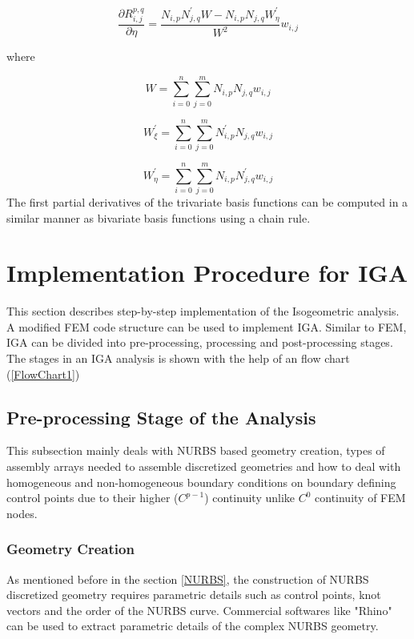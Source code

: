 \documentclass[12pt]{article}
\begin{document}
\begin{equation}
\frac{\partial R_{i,j}^{p,q}}{\partial \eta} = \frac{N_{i,p} N^{'}_{j,q} W - N_{i,p} N_{j,q} W^{'}_{\eta}}{W^2}w_{i,j}
\end{equation}

\noindent
where

\begin{equation}
W = \sum_{i=0}^{n}\sum_{j=0}^{m}N_{i,p} N_{j,q}w_{i,j}
\end{equation}

\begin{equation}
W^{'}_{\xi} = \sum_{i=0}^{n}\sum_{j=0}^{m}N^{'}_{i,p} N_{j,q}w_{i,j}
\end{equation}

\begin{equation}
W^{'}_{\eta} = \sum_{i=0}^{n}\sum_{j=0}^{m}N_{i,p} N^{'}_{j,q}w_{i,j}
\end{equation}
The first partial derivatives of the trivariate basis functions can be computed in a similar manner as bivariate basis functions using a chain rule.



\section{Implementation Procedure for IGA}
This section describes step-by-step implementation of the Isogeometric analysis. A modified FEM code structure can be used to implement IGA. Similar to FEM, IGA can be divided into pre-processing, processing and post-processing stages. The stages in an IGA analysis is shown with the help of an flow chart (\ref{FlowChart1})


\subsection{Pre-processing Stage of the Analysis}
This subsection mainly deals with NURBS based geometry creation, types of assembly arrays needed to assemble discretized geometries and how to deal with homogeneous and non-homogeneous boundary conditions on boundary defining control points due to their higher ($C^{p-1}$) continuity unlike $C^{0}$ continuity of FEM nodes. 
\subsubsection{Geometry Creation}
As mentioned before in the section \ref{NURBS}, the construction of NURBS discretized geometry requires parametric details such as control points, knot vectors and the order of the NURBS curve. Commercial softwares like "Rhino" can be used to extract parametric details of the complex NURBS geometry. \\
\end{document}

